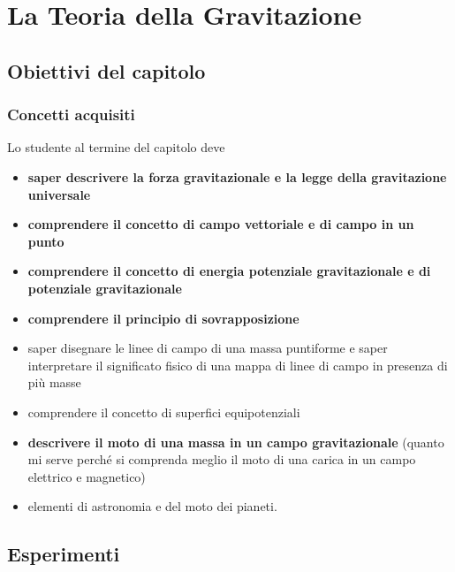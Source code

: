 \documentclass[11pt]{report}
\begin{document}
\chapter{La Teoria della Gravitazione}

\section*{Obiettivi del capitolo}

\subsection*{Concetti acquisiti}
Lo studente al termine del capitolo deve
\begin{itemize}
    \item \textbf{saper descrivere la forza gravitazionale e la legge della gravitazione universale}
    \item \textbf{comprendere il concetto di campo vettoriale e di campo in un punto}
    \item \textbf{comprendere il concetto di energia potenziale gravitazionale e di potenziale gravitazionale}
    \item \textbf{comprendere il principio di sovrapposizione}
    \item saper disegnare le linee di campo di una massa puntiforme e saper interpretare il significato fisico di una mappa di linee di campo in presenza di più masse 
    \item comprendere il concetto di superfici equipotenziali
    \item \textbf{descrivere il moto di una massa in un campo gravitazionale} (quanto mi serve perché si comprenda meglio il moto di una carica in un campo elettrico e magnetico)
    \item elementi di astronomia e del moto dei pianeti.
\end{itemize}

\section*{Esperimenti}
\end{document}
